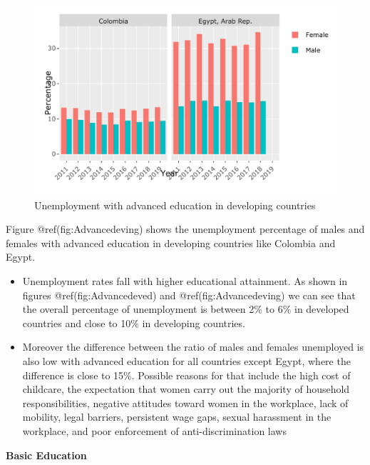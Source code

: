 \documentclass[
]{article}
\begin{document}
\begin{figure}
\centering
\includegraphics{The_Outsiders_5513_files/figure-latex/Advancedeving-1.pdf}
\caption{Unemployment with advanced education in developing countries}
\end{figure}

Figure @ref(fig:Advancedeving) shows the unemployment percentage of
males and females with advanced education in developing countries like
Colombia and Egypt.

\begin{itemize}
\item
  Unemployment rates fall with higher educational attainment. As shown
  in figures @ref(fig:Advancedeved) and @ref(fig:Advancedeving) we can
  see that the overall percentage of unemployment is between 2\% to 6\%
  in developed countries and close to 10\% in developing countries.
\item
  Moreover the difference between the ratio of males and females
  unemployed is also low with advanced education for all countries
  except Egypt, where the difference is close to 15\%. Possible reasons
  for that include the high cost of childcare, the expectation that
  women carry out the majority of household responsibilities, negative
  attitudes toward women in the workplace, lack of mobility, legal
  barriers, persistent wage gaps, sexual harassment in the workplace,
  and poor enforcement of anti-discrimination laws
  \autocite{barriersegypt}
\end{itemize}

\clearpage

\textbf{Basic Education}
\end{document}
